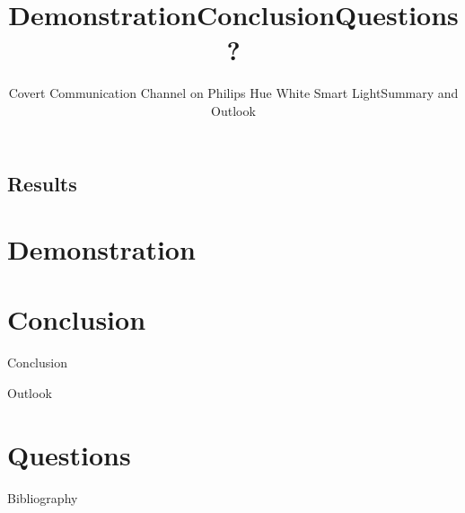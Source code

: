 \documentclass[11pt,t,usepdftitle=false,aspectratio=169]{beamer}
\begin{document}
\subsection{Results}%
\label{sub:results}


\section{Demonstration} %
\label{sec:demonstration}
\title{Demonstration}
\subtitle{Covert Communication Channel on Philips Hue White Smart Light}

\section{Conclusion} %
\label{sec:conclusion}
\title{Conclusion}
\subtitle{Summary and Outlook}
\begin{frame}{Conclusion} %

\end{frame}

\begin{frame}{Outlook} %

\end{frame}



\title{Questions?}
\subtitle{}
\section{Questions}


\appendix

\begin{frame}[allowframebreaks]{Bibliography}
	
	
\end{frame}
\end{document}
